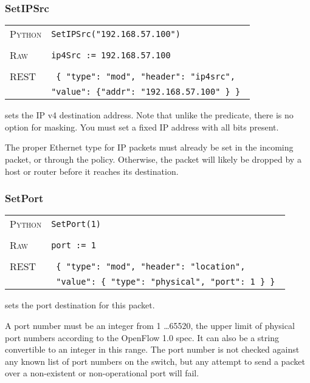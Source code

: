 \subsubsection{SetIPSrc}

\bigskip
\begin{tabularx}{\linewidth}{lX}
\textsc{Python}   & \texttt{SetIPSrc("192.168.57.100")} \\ \\
\textsc{Raw}    & \texttt{ip4Src := 192.168.57.100}     \\ \\
\textsc{REST} & \texttt{ \{ "type": "mod", "header": "ip4src", } \\
  & \texttt{"value": \{"addr": "192.168.57.100" \} \} }
\end{tabularx}

 sets the IP v4 destination address.  Note that unlike the  predicate,
there is no option for masking.  You must set a fixed IP address with all bits present.    

The proper Ethernet type for IP packets must already be set in the incoming packet, or through the 
 policy.  Otherwise, the packet will likely be dropped by a host or router before it 
reaches its destination.

\subsubsection{SetPort}

\bigskip
\begin{tabularx}{\linewidth}{lX}
\textsc{Python}   & \texttt{SetPort(1)} \\ \\
\textsc{Raw}    & \texttt{port := 1}     \\ \\
\textsc{REST} & \texttt{ \{ "type": "mod", "header": "location", } \\
 & \texttt{ "value": \{ "type": "physical", "port": 1 \} \} } 
\end{tabularx}

 sets the port destination for this packet.      

A port number must be an integer from
1 \ldots 65520, the upper limit of physical port numbers according to the OpenFlow 1.0 spec.  It can also be 
a string convertible to an integer in this range.  The port number is not checked against any known list
of port numbers on the switch, but any attempt to send a packet over a non-existent or non-operational
port will fail.  

